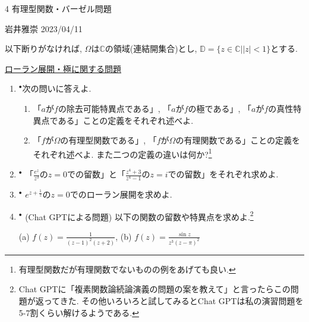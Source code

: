 \documentclass[dvipdfmx,a4paper,11pt]{article}
\newcommand{\C}{\mathbb{C}}
\newcommand{\D}{\mathbb{D}}
\theoremstyle{definition}
\begin{document}

\begin{center}
{\Large 4 有理型関数・バーゼル問題}
\end{center}

\begin{flushright}
 岩井雅崇 2023/04/11
\end{flushright}
以下断りがなければ, $\Omega$は$\C$の領域(連結開集合)とし, $\D=\{z \in \C |  |z| <1\}$とする. 

\vspace{12pt}
\hspace{-24pt}\underline{ローラン展開・極に関する問題}

\begin{enumerate}[label=\textbf{問}4.\arabic*]

\item $^{\bullet}$次の問いに答えよ. %
   \begin{enumerate}
 \setlength{\parskip}{0cm} 
  \setlength{\itemsep}{0cm} 
  \item 「$a$が$f$の除去可能特異点である」, 「$a$が$f$の極である」, 「$a$が$f$の真性特異点である」ことの定義をそれぞれ述べよ.
  \item 「$f$が$\Omega$の有理型関数である」, 「$f$が$\Omega$の有理関数である」ことの定義をそれぞれ述べよ. また二つの定義の違いは何か?\footnote{有理型関数だが有理関数でないものの例をあげても良い. }
    \end{enumerate}
    
 
\item $^{\bullet}$ 「$\frac{e^z}{z^3}$の$z=0$での留数」と「$\frac{z^4 + 3}{z^4 -1}$の$z=i$での留数」をそれぞれ求めよ.
\item $^{\bullet}$ $e^{z + \frac{1}{z}}$の$z=0$でのローラン展開を求めよ.

\item $^{\bullet}$ (Chat GPTによる問題) 以下の関数の留数や特異点を求めよ.\footnote{Chat GPTに「複素関数論続論演義の問題の案を教えて」と言ったらこの問題が返ってきた. その他いろいろと試してみるとChat GPTは私の演習問題を5-7割くらい解けるようである. }

(a) $f(z) = \frac{1}{(z-1)^2(z+2)}$,  
(b) $f(z) = \frac{\sin z}{z^3(z-\pi)^2}$



\end{enumerate}
\end{document}
